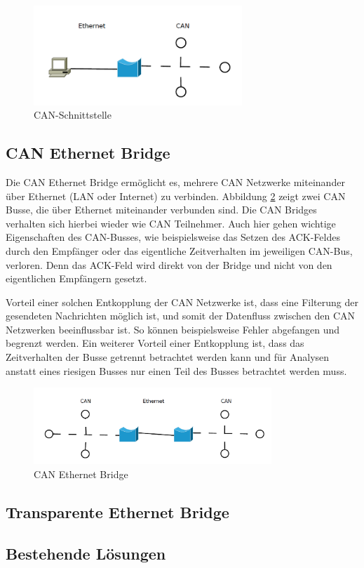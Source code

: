 \begin{figure}[h] 
\centering
\includegraphics[width=0.7\textwidth]{figures/can_gateway}
\caption{CAN-Schnittstelle} 
\label{gateway}
\end{figure} 

\subsection{CAN Ethernet Bridge}

Die CAN Ethernet Bridge ermöglicht es, mehrere CAN Netzwerke miteinander über Ethernet 
(LAN oder Internet) zu verbinden. Abbildung \ref{bridge} zeigt zwei CAN Busse, die über 
Ethernet miteinander verbunden sind. Die CAN Bridges verhalten sich hierbei wieder wie 
CAN Teilnehmer. Auch hier gehen wichtige Eigenschaften des CAN-Busses, wie beispielsweise 
das Setzen des ACK-Feldes durch den Empfänger oder das eigentliche Zeitverhalten im 
jeweiligen CAN-Bus, verloren. Denn das ACK-Feld wird direkt von der Bridge und nicht von 
den eigentlichen Empfängern gesetzt.

Vorteil einer solchen Entkopplung der CAN Netzwerke ist, dass eine Filterung der gesendeten 
Nachrichten möglich ist, und somit der Datenfluss zwischen den CAN Netzwerken beeinflussbar 
ist. So können beispielsweise Fehler abgefangen und begrenzt werden. Ein weiterer Vorteil 
einer Entkopplung ist, dass das Zeitverhalten der Busse getrennt betrachtet werden kann 
und für Analysen anstatt eines riesigen Busses nur einen Teil des Busses betrachtet werden 
muss.

\begin{figure}[h] 
\centering
\includegraphics[width=0.8\textwidth]{figures/can_bridge}
\caption{CAN Ethernet Bridge} 
\label{bridge}
\end{figure} 

\subsection{Transparente Ethernet Bridge}
	
\subsection{Bestehende Lösungen}



\newpage {} \listoffigures

\newpage {}
% 


